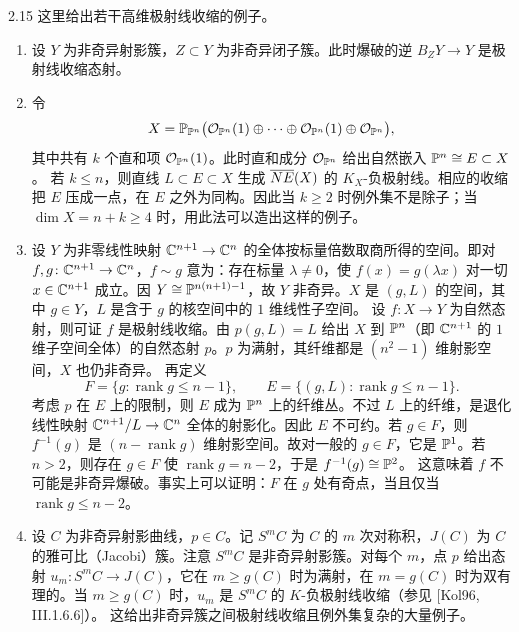 \begin{example}{2.15}
这里给出若干高维极射线收缩的例子。
\begin{enumerate}[label=（\arabic*）,leftmargin=2.6em,itemsep=1pt]
\item 设 $Y$ 为非奇异射影簇，$Z\subset Y$ 为非奇异闭子簇。此时爆破的逆 $B_ZY\to Y$ 是极射线收缩态射。
\item 令
\[
X=\mathbb{P}_{\mathbb{P}^n}\bigl(\mathcal{O}_{\mathbb{P}^n}(1)\oplus\cdots\oplus\mathcal{O}_{\mathbb{P}^n}(1)\oplus\mathcal{O}_{\mathbb{P}^n}\bigr),
\]
其中共有 $k$ 个直和项 $\mathcal{O}_{\mathbb{P}^n}(1)$。此时直和成分 $\mathcal{O}_{\mathbb{P}^n}$ 给出自然嵌入 $\mathbb{P}^n\cong E\subset X$。
若 $k\le n$，则直线 $L\subset E\subset X$ 生成 $\overline{NE}(X)$ 的 $K_X$-负极射线。相应的收缩把 $E$ 压成一点，在 $E$ 之外为同构。因此当 $k\ge2$ 时例外集不是除子；当 $\dim X=n+k\ge4$ 时，用此法可以造出这样的例子。
\item 设 $Y$ 为非零线性映射 $\mathbb{C}^{n+1}\to\mathbb{C}^n$ 的全体按标量倍数取商所得的空间。即对 $f,g\colon\mathbb{C}^{n+1}\to\mathbb{C}^n$，$f\sim g$ 意为：存在标量 $\lambda\ne0$，使 $f(x)=g(\lambda x)$ 对一切 $x\in\mathbb{C}^{n+1}$ 成立。因 $Y\cong\mathbb{P}^{n(n+1)-1}$，故 $Y$ 非奇异。$X$ 是 $(g,L)$
的空间，其中 $g\in Y$，$L$ 是含于 $g$ 的核空间中的 $1$ 维线性子空间。
设 $f\colon X\to Y$ 为自然态射，则可证 $f$ 是极射线收缩。由 $p(g,L)=L$ 给出 $X$ 到 $\mathbb{P}^n$（即 $\mathbb{C}^{n+1}$ 的 $1$ 维子空间全体）的自然态射 $p$。$p$ 为满射，其纤维都是 $(n^2-1)$ 维射影空间，$X$ 也仍非奇异。
再定义
\[
F=\{g:\operatorname{rank}g\le n-1\},\qquad E=\{(g,L):\operatorname{rank}g\le n-1\}.
\]
考虑 $p$ 在 $E$ 上的限制，则 $E$ 成为 $\mathbb{P}^n$ 上的纤维丛。不过 $L$ 上的纤维，是退化线性映射 $\mathbb{C}^{n+1}/L\to\mathbb{C}^n$ 全体的射影化。因此 $E$ 不可约。若 $g\in F$，则 $f^{-1}(g)$ 是 $(n-\operatorname{rank}g)$ 维射影空间。故对一般的 $g\in F$，它是 $\mathbb{P}^1$。若 $n>2$，则存在 $g\in F$ 使 $\operatorname{rank}g=n-2$，于是 $f^{-1}(g)\cong\mathbb{P}^2$。
这意味着 $f$ 不可能是非奇异爆破。事实上可以证明：$F$ 在 $g$ 处有奇点，当且仅当 $\operatorname{rank}g\le n-2$。
\item 设 $C$ 为非奇异射影曲线，$p\in C$。记 $S^mC$ 为 $C$ 的 $m$ 次对称积，$J(C)$ 为 $C$ 的雅可比（Jacobi）簇。注意 $S^mC$ 是非奇异射影簇。对每个 $m$，点 $p$ 给出态射 $u_m\colon S^mC\to J(C)$，它在 $m\ge g(C)$ 时为满射，在 $m=g(C)$ 时为双有理的。当 $m\ge g(C)$ 时，$u_m$ 是 $S^mC$ 的 $K$-负极射线收缩（参见 [Kol96, III.1.6.6]）。
这给出非奇异簇之间极射线收缩且例外集复杂的大量例子。
\end{enumerate}
\end{example}


